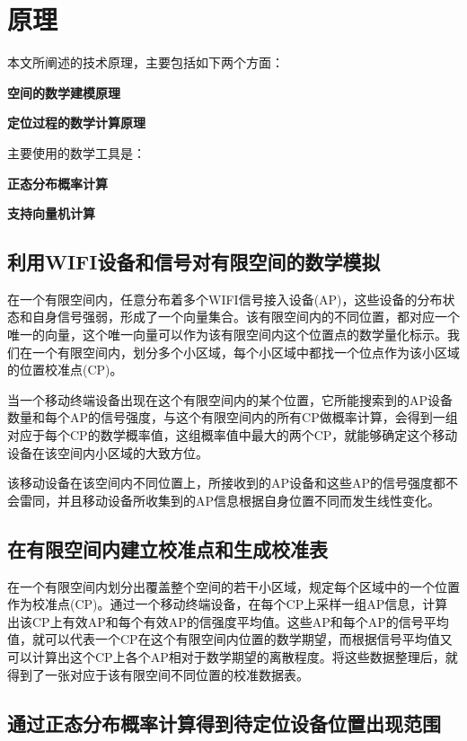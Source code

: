 \documentclass[UTF8, twocolumn ]{ctexart}
\begin{document}

\section{原理}
本文所阐述的技术原理，主要包括如下两个方面：
\begin{compactitem}
\item\textbf{空间的数学建模原理}
\item\textbf{定位过程的数学计算原理}
\end{compactitem}
\par
主要使用的数学工具是：
\begin{compactitem}
\item\textbf{正态分布概率计算}
\item\textbf{支持向量机计算}
\end{compactitem}

\subsection{利用WIFI设备和信号对有限空间的数学模拟}
在一个有限空间内，任意分布着多个WIFI信号接入设备(AP)，这些设备的分布状态和自身信号强弱，形成了一个向量集合。该有限空间内的不同位置，都对应一个唯一的向量，这个唯一向量可以作为该有限空间内这个位置点的数学量化标示。我们在一个有限空间内，划分多个小区域，每个小区域中都找一个位点作为该小区域的位置校准点(CP)。
\par
当一个移动终端设备出现在这个有限空间内的某个位置，它所能搜索到的AP设备数量和每个AP的信号强度，与这个有限空间内的所有CP做概率计算，会得到一组对应于每个CP的数学概率值，这组概率值中最大的两个CP，就能够确定这个移动设备在该空间内小区域的大致方位。
\par
该移动设备在该空间内不同位置上，所接收到的AP设备和这些AP的信号强度都不会雷同，并且移动设备所收集到的AP信息根据自身位置不同而发生线性变化。
\subsection{在有限空间内建立校准点和生成校准表}
在一个有限空间内划分出覆盖整个空间的若干小区域，规定每个区域中的一个位置作为校准点(CP)。通过一个移动终端设备，在每个CP上采样一组AP信息，计算出该CP上有效AP和每个有效AP的信强度平均值。这些AP和每个AP的信号平均值，就可以代表一个CP在这个有限空间内位置的数学期望，而根据信号平均值又可以计算出这个CP上各个AP相对于数学期望的离散程度。将这些数据整理后，就得到了一张对应于该有限空间不同位置的校准数据表。

\subsection{通过正态分布概率计算得到待定位设备位置出现范围}
\end{document}

